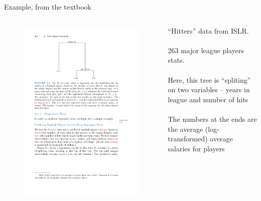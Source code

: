 \documentclass[mathserif, aspectratio=169]{beamer}
\begin{document}
\begin{frame}{Example, from the textbook}

\begin{columns}
\begin{figure}
\includegraphics[height=0.65\textheight]{simple_tree}
\caption*{}
\end{figure}

``Hitters'' data from ISLR.  \\~\\

263 major league players stats.  \\~\\

Here, this tree is ``spliting'' on two variables -- years in league and number of hits\\~\\

The numbers at the ends are the average (log-transformed) average salaries for players \\~\\


\end{columns}
\end{frame}
\end{document}
